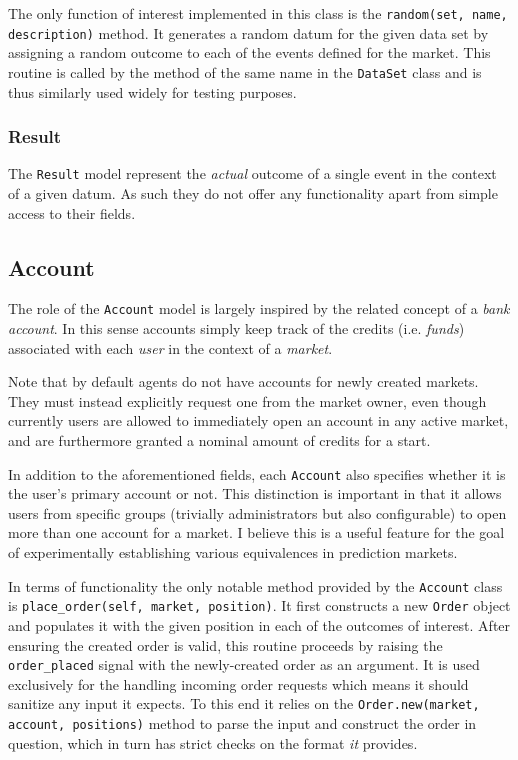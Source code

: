 \documentclass[bsc,frontabs,twoside,singlespacing,parskip,deptreport]{infthesis}     %
\begin{document}
	The only function of interest implemented in this class is the {\tt random(set, name, description)} method. It generates a random datum for the given data set by assigning a random outcome to each of the events defined for the market. This routine is called by the method of the same name in the {\tt DataSet} class and is thus similarly used widely for testing purposes. 

\subsubsection{Result}

	The {\tt Result} model represent the {\it actual} outcome of a single event in the context of a given datum. As such they do not offer any functionality apart from simple access to their fields. 

\subsection{Account}
	The role of the {\tt Account} model is largely inspired by the related concept of a {\it bank account}. In this sense accounts simply keep track of the credits (i.e. {\it funds}) associated with each {\it user} in the context of a {\it market}. 

	Note that by default agents do not have accounts for newly created markets. They must instead explicitly request one from the market owner, even though currently users are allowed to immediately open an account in any active market, and are furthermore granted a nominal amount of credits for a start. 

	In addition to the aforementioned fields, each {\tt Account} also specifies whether it is the user's primary account or not. This distinction is important in that it allows users from specific groups (trivially administrators but also configurable) to open more than one account for a market. I believe this is a useful feature for the goal of experimentally establishing various equivalences in prediction markets. 

	In terms of functionality the only notable method provided by the {\tt Account} class is {\tt place\_order(self, market, position)}. It first constructs a new {\tt Order} object and populates it with the given position in each of the outcomes of interest. After ensuring the created order is valid, this routine proceeds by raising the {\tt order\_placed} signal with the newly-created order as an argument. It is used exclusively for the handling incoming order requests which means it should sanitize any input it expects. To this end it relies on the {\tt Order.new(market, account, positions)} method to parse the input and construct the order in question, which in turn has strict checks on the format {\it it} provides. 
\end{document}
